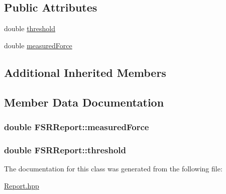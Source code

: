 \subsection*{Public Attributes}
\begin{DoxyCompactItemize}
\item 
double \hyperlink{classFSRReport_a9373db6d07f9794282e1a56d9c605201}{threshold}
\item 
double \hyperlink{classFSRReport_a512ecbc199081bf26fe9ca185843abf2}{measured\+Force}
\end{DoxyCompactItemize}
\subsection*{Additional Inherited Members}


\subsection{Member Data Documentation}
\subsubsection[{\texorpdfstring{measured\+Force}{measuredForce}}]{\setlength{\rightskip}{0pt plus 5cm}double F\+S\+R\+Report\+::measured\+Force}\hypertarget{classFSRReport_a512ecbc199081bf26fe9ca185843abf2}{}\label{classFSRReport_a512ecbc199081bf26fe9ca185843abf2}
\subsubsection[{\texorpdfstring{threshold}{threshold}}]{\setlength{\rightskip}{0pt plus 5cm}double F\+S\+R\+Report\+::threshold}\hypertarget{classFSRReport_a9373db6d07f9794282e1a56d9c605201}{}\label{classFSRReport_a9373db6d07f9794282e1a56d9c605201}


The documentation for this class was generated from the following file\+:\begin{DoxyCompactItemize}
\item 
\hyperlink{Report_8hpp}{Report.\+hpp}\end{DoxyCompactItemize}
